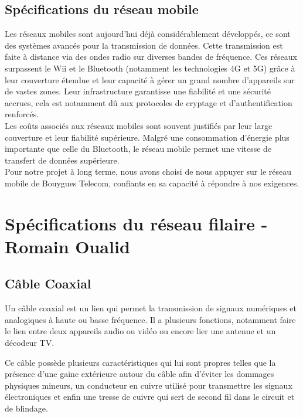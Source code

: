 \documentclass[12]{article}
\begin{document}
\subsection{Spécifications du réseau mobile}
Les réseaux mobiles sont aujourd’hui déjà considérablement développés, ce sont des systèmes avancés pour la transmission de données. Cette transmission est faite à distance via des ondes radio sur diverses bandes de fréquence. Ces réseaux surpassent le Wii et le Bluetooth (notamment les technologies 4G et 5G) grâce à leur couverture étendue et leur capacité à gérer un grand nombre d'appareils sur de vastes zones. Leur infrastructure garantisse une fiabilité et une sécurité accrues, cela est notamment dû aux protocoles de cryptage et d'authentification renforcés. \\

Les coûts associés aux réseaux mobiles sont souvent justifiés par leur large couverture et leur fiabilité supérieure. Malgré une consommation d'énergie plus importante que celle du Bluetooth, le réseau mobile permet une vitesse de transfert de données supérieure.\\

Pour notre projet à long terme, nous avons choisi de nous appuyer sur le réseau mobile de Bouygues Telecom, confiants en sa capacité à répondre à nos exigences.	



\section{Spécifications du réseau filaire - Romain Oualid} 

\subsection{Câble Coaxial}

Un câble coaxial est un lien qui permet la transmission de signaux numériques et analogiques à haute ou basse fréquence. Il a plusieurs fonctions, notamment faire le lien entre deux appareils audio ou vidéo ou encore lier une antenne et un décodeur TV. 

Ce câble possède plusieurs caractéristiques qui lui sont propres telles que la présence d'une gaine extérieure autour du câble afin d'éviter les dommages physiques mineurs, un conducteur en cuivre utilisé pour transmettre les signaux électroniques et enfin une tresse de cuivre qui sert de second fil dans le circuit et de blindage. 
\end{document}
